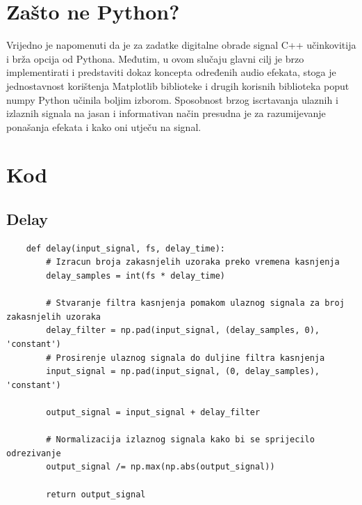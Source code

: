 \documentclass[times, utf8, seminar, numeric]{fer}
\begin{document}
\section{Zašto ne Python?}
Vrijedno je napomenuti da je za zadatke digitalne obrade signal C++ učinkovitija i brža opcija od Pythona. Međutim, u ovom slučaju glavni cilj je brzo implementirati i predstaviti dokaz koncepta određenih audio efekata, stoga je jednostavnost korištenja Matplotlib biblioteke i drugih korisnih biblioteka poput numpy Python učinila boljim izborom. Sposobnost brzog iscrtavanja ulaznih i izlaznih signala na jasan i informativan način presudna je za razumijevanje ponašanja efekata i kako oni utječu na signal.

\newpage
\section{Kod}
\subsection{Delay}
\begin{lstlisting}
	def delay(input_signal, fs, delay_time):
		# Izracun broja zakasnjelih uzoraka preko vremena kasnjenja
		delay_samples = int(fs * delay_time)
		
		# Stvaranje filtra kasnjenja pomakom ulaznog signala za broj zakasnjelih uzoraka
		delay_filter = np.pad(input_signal, (delay_samples, 0), 'constant')
		# Prosirenje ulaznog signala do duljine filtra kasnjenja
		input_signal = np.pad(input_signal, (0, delay_samples), 'constant')
		
		output_signal = input_signal + delay_filter
		
		# Normalizacija izlaznog signala kako bi se sprijecilo odrezivanje
		output_signal /= np.max(np.abs(output_signal))
		
		return output_signal
\end{lstlisting}

\pagebreak
\end{document}
